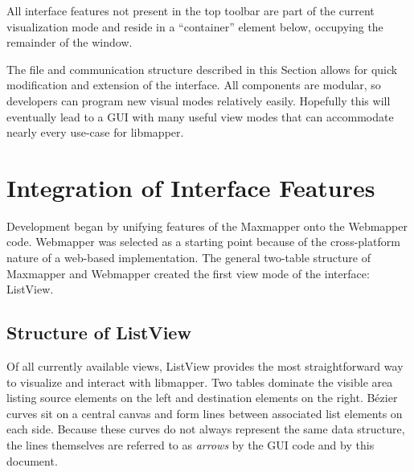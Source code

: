 All interface features not present in the top toolbar are part of the current visualization mode and reside in a ``container'' element below, occupying the remainder of the window.


The file and communication structure described in this Section allows for quick modification and extension of the interface. All components are modular, so developers can program new visual modes relatively easily. Hopefully this will eventually lead to a GUI with many useful view modes that can accommodate nearly every use-case for libmapper.


\section{Integration of Interface Features} %
\label{sec:integration_of_interface_features}

Development began by unifying features of the Maxmapper onto the Webmapper code. Webmapper was selected as a starting point because of the cross-platform nature of a web-based implementation. The general two-table structure of Maxmapper and Webmapper created the first view mode of the interface: ListView.

	\subsection{Structure of ListView} %
	\label{sub:ListView}

Of all currently available views, ListView provides the most straightforward way to visualize and interact with libmapper. Two tables dominate the visible area listing source elements on the left and destination elements on the right. B\'ezier curves sit on a central canvas and form lines between associated list elements on each side. Because these curves do not always represent the same data structure, the lines themselves are referred to as \emph{arrows} by the GUI code and by this document.

